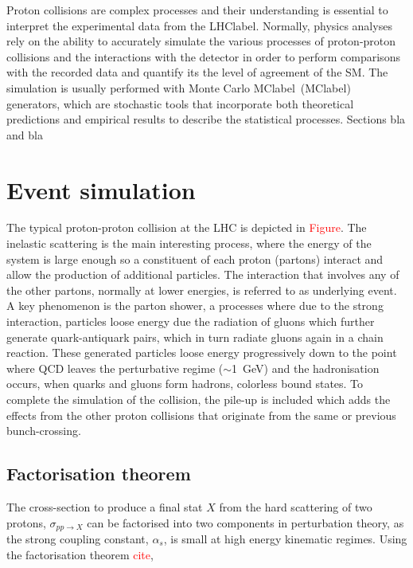 Proton collisions are complex processes and their understanding is essential to interpret the experimental data from the \acrshort{LHClabel}. Normally, physics analyses rely on the ability to accurately simulate the various processes of proton-proton collisions and the interactions with the detector in order to perform comparisons with the recorded data and quantify its the level of agreement of the SM. The simulation is usually performed with Monte Carlo \acrlong{MClabel}~(\acrshort{MClabel}) generators, which are stochastic tools that incorporate both theoretical predictions and empirical results to describe the statistical processes.
Sections bla and bla 

\section{Event simulation}

The typical proton-proton collision at the LHC is depicted in \textcolor{red}{Figure}. The inelastic scattering is the main interesting process, where the energy of the system is large enough so a constituent of each proton (partons) interact and allow the production of additional particles. The interaction that involves any of the other partons, normally at lower energies, is referred to as underlying event. A key phenomenon is the parton shower, a processes where due to the strong interaction, particles loose energy due the radiation of gluons which further generate quark-antiquark pairs, which in turn radiate gluons again in a chain reaction. These generated particles loose energy progressively down to the point where \acrshort{QCD} leaves the perturbative regime ($\sim$1~GeV) and the hadronisation occurs, when quarks and gluons form hadrons, colorless bound states. To complete the simulation of the collision, the pile-up is included which adds the effects from the other proton collisions that originate from the same or previous bunch-crossing.  

\subsection{Factorisation theorem}

The cross-section to produce a final stat $X$ from the hard scattering of two protons, $\sigma_{pp\to X}$ can be factorised into two components in perturbation theory, as the strong coupling constant, $\alpha_s$, is small at high energy kinematic regimes. Using the factorisation theorem \textcolor{red}{cite},

